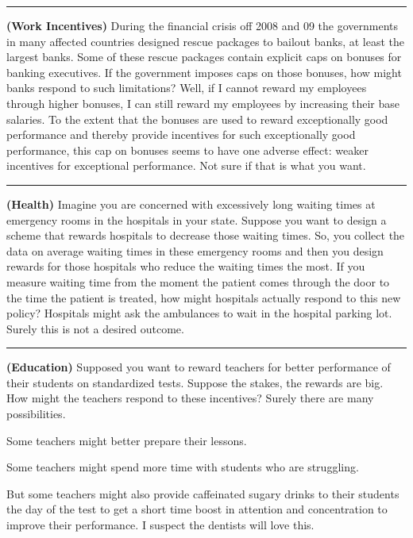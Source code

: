\documentclass[
]{book}
\begin{document}
\begin{center}\rule{0.5\linewidth}{0.5pt}\end{center}

\textbf{(Work Incentives)} During the financial crisis off 2008 and 09 the governments in many affected countries designed rescue packages to bailout banks, at least the largest banks. Some of these rescue packages contain explicit caps on bonuses for banking executives. If the government imposes caps on those bonuses, how might banks respond to such limitations? Well, if I cannot reward my employees through higher bonuses, I can still reward my employees by increasing their base salaries. To the extent that the bonuses are used to reward exceptionally good performance and thereby provide incentives for such exceptionally good performance, this cap on bonuses seems to have one adverse effect: weaker incentives for exceptional performance. Not sure if that is what you want.

\begin{center}\rule{0.5\linewidth}{0.5pt}\end{center}

\textbf{(Health)} Imagine you are concerned with excessively long waiting times at emergency rooms in the hospitals in your state. Suppose you want to design a scheme that rewards hospitals to decrease those waiting times. So, you collect the data on average waiting times in these emergency rooms and then you design rewards for those hospitals who reduce the waiting times the most. If you measure waiting time from the moment the patient comes through the door to the time the patient is treated, how might hospitals actually respond to this new policy?
Hospitals might ask the ambulances to wait in the hospital parking lot. Surely this is not a desired outcome.

\begin{center}\rule{0.5\linewidth}{0.5pt}\end{center}

\textbf{(Education)} Supposed you want to reward teachers for better performance of their students on standardized tests. Suppose the stakes, the rewards are big. How might the teachers respond to these incentives? Surely there are many possibilities.

Some teachers might better prepare their lessons.

Some teachers might spend more time with students who are struggling.

But some teachers might also provide caffeinated sugary drinks to their students the day of the test to get a short time boost in attention and concentration to improve their performance. I suspect the dentists will love this.
\end{document}
